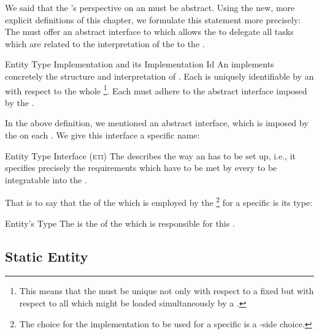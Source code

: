 \documentclass[a4paper, 12pt]{book}
\begin{document}
We said that the \SYNEIGHT's perspective on an  must
be abstract. Using the new, more explicit definitions of this chapter, we
formulate this statement more precisely: The 
must offer an abstract interface to \SYNEIGHT which allows the
\SYNEIGHT to delegate all tasks which are related to the interpretation
of the  to the .
\begin{definition*}{Entity Type Implementation and its Implementation
    Id}
  \label{def:encapsulated-state-implementation}
  An  implements concretely the structure and
  interpretation of . Each  is uniquely identifiable by an 
  with respect to the whole \SYNEIGHT\footnote{This means that the
   must be unique not only with respect to a fixed
   but with respect to all  which might be loaded
  simultaneously by a .}. 
  Each  must adhere to the abstract interface
  imposed by the \SYNEIGHT.
\end{definition*}
%
In the above definition, we mentioned an abstract interface, which is imposed
by the \SYNEIGHT on each . We give this
interface a specific name:
\newcommand{\ETI}{\normalfont\textsc{eti}\xspace}
\begin{definition*}{Entity Type Interface (\ETI)}
  The  describes the way an  has to be set up, i.e., it specifies precisely the
  requirements which have to be met by every 
  to be integratable into the \SYNEIGHT.
\end{definition*}
%
That is to say that the  of the  which is employed by the \footnote{The choice for
  the implementation to be used for a specific  is a
  -side choice.} for a specific  is its
type:
\begin{definition*}{Entity's Type}
  The  is the  of the  which is responsible for this .
\end{definition*}

\subsection{Static Entity}
\end{document}
